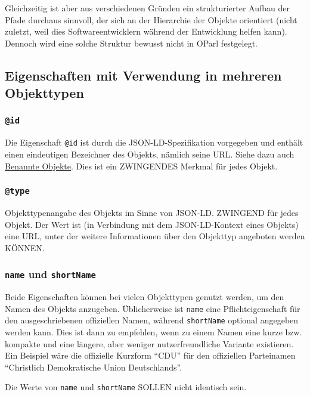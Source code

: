 \documentclass[,a4paper]{article}
\begin{document}
Gleichzeitig ist aber aus verschiedenen Gründen ein strukturierter
Aufbau der Pfade durchaus sinnvoll, der sich an der Hierarchie der
Objekte orientiert (nicht zuletzt, weil dies Softwareentwicklern während
der Entwicklung helfen kann). Dennoch wird eine solche Struktur bewusst
nicht in OParl festgelegt.

\subsection{Eigenschaften mit Verwendung in mehreren
Objekttypen}\label{eigenschaften-mit-verwendung-in-mehreren-objekttypen}

\subsubsection{\texttt{@id}}\label{id}

Die Eigenschaft \texttt{@id} ist durch die JSON-LD-Spezifikation
vorgegeben und enthält einen eindeutigen Bezeichner des Objekts, nämlich
seine URL. Siehe dazu auch \hyperref[benannteux5fobjekte]{Benannte
Objekte}. Dies ist ein ZWINGENDES Merkmal für jedes Objekt.

\subsubsection{\texttt{@type}}\label{type}

Objekttypenangabe des Objekts im Sinne von JSON-LD. ZWINGEND für jedes
Objekt. Der Wert ist (in Verbindung mit dem JSON-LD-Kontext eines
Objekts) eine URL, unter der weitere Informationen über den Objekttyp
angeboten werden KÖNNEN.

\subsubsection{\texttt{name} und
\texttt{shortName}}\label{name-und-shortname}

Beide Eigenschaften können bei vielen Objekttypen genutzt werden, um den
Namen des Objekts anzugeben. Üblicherweise ist \texttt{name} eine
Pflichteigenschaft für den ausgeschriebenen offiziellen Namen, während
\texttt{shortName} optional angegeben werden kann. Dies ist dann zu
empfehlen, wenn zu einem Namen eine kurze bzw. kompakte und eine
längere, aber weniger nutzerfreundliche Variante existieren. Ein
Beispiel wäre die offizielle Kurzform ``CDU'' für den offiziellen
Parteinamen ``Christlich Demokratische Union Deutschlands''.

Die Werte von \texttt{name} und \texttt{shortName} SOLLEN nicht
identisch sein.
\end{document}
